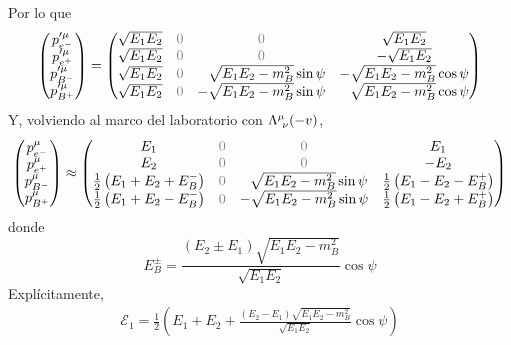 \documentclass[]{report}
\numberwithin{equation}{section}
\newcommand{\LambdaMuNu}{\indUpDown}
\newcommand{\0}{\textcolor{gray}{0}}
\begin{document}
\begin{enumerate}
	Por lo que
	\begin{equation}
		\begin{pmatrix}
			p'^{\mu}_{e^{-}}\\
			p'^{\mu}_{e^{+}}\\
			p'^{\mu}_{B^{-}}\\
			p'^{\mu}_{B^{+}}
		\end{pmatrix} = \begin{pmatrix}
			\sqrt{E_{1} E_{2}} & \0 & \0 								&  \sqrt{E_{1} E_{2}}\\
			\sqrt{E_{1} E_{2}} & \0 & \0 								& -\sqrt{E_{1} E_{2}}\\
			\sqrt{E_{1} E_{2}} & \0 & \hfill\sqrt{E_{1} E_{2} - m_{B}^2}\sin\psi	& -\sqrt{E_{1} E_{2} - m_{B}^2}\cos\psi\\
			\sqrt{E_{1} E_{2}} & \0 & -\sqrt{E_{1} E_{2} - m_{B}^2}\sin\psi 		& \hfill\sqrt{E_{1} E_{2} - m_{B}^2}\cos\psi
		\end{pmatrix}
	\end{equation}
	Y, volviendo al marco del laboratorio con \(\LambdaMuNu(-v)\),
	\begin{equation}
		\begin{pmatrix}
			p^{\mu}_{e^{-}}\\
			p^{\mu}_{e^{+}}\\
			p^{\mu}_{B^{-}}\\
			p^{\mu}_{B^{+}}
		\end{pmatrix} \approx \begin{pmatrix}
			E_{1} & \0 & \0 								&  E_{1}\\
			E_{2} & \0 & \0 								& -E_{2}\\
			\frac{1}{2}\left(E_{1} + E_{2} + E_{B}^{-}\right) & \0 & ~~\sqrt{E_{1} E_{2} - m_{B}^2}\sin\psi	& \frac{1}{2}\left(E_{1} - E_{2} - E_{B}^{+}\right)\\
			\frac{1}{2}\left(E_{1} + E_{2} - E_{B}^{-}\right) & \0 & -\sqrt{E_{1} E_{2} - m_{B}^2}\sin\psi & \frac{1}{2}\left(E_{1} - E_{2} + E_{B}^{+}\right)
		\end{pmatrix}
	\end{equation}
	donde
	\begin{equation}
		E_{B}^{\pm} = \frac{(E_{2}\pm E_{1})\sqrt{E_{1} E_{2}-m_{B}^2}}{\sqrt{E_{1} E_{2}}}\cos\psi 
	\end{equation}
	Explícitamente,
	\begin{align}
		\mathcal{E}_{1} = \frac{1}{2} \left(E_{1} + E_{2} + \frac{(E_{2} - E_{1})\sqrt{E_{1} E_{2}-m_{B}^2}}{\sqrt{E_{1} E_{2}}}\cos\psi\right)
	\end{align}

\end{enumerate}
\end{document}
